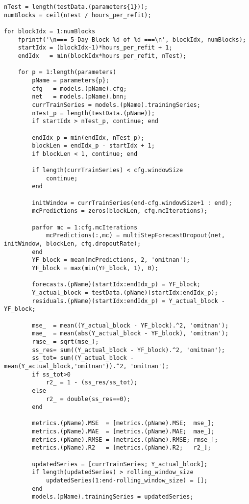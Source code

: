 \begin{verbatim}
nTest = length(testData.(parameters{1}));
numBlocks = ceil(nTest / hours_per_refit);

for blockIdx = 1:numBlocks
    fprintf('\n=== 5-Day Block %d of %d ===\n', blockIdx, numBlocks);
    startIdx = (blockIdx-1)*hours_per_refit + 1;
    endIdx   = min(blockIdx*hours_per_refit, nTest);
    
    for p = 1:length(parameters)
        pName = parameters{p};
        cfg   = models.(pName).cfg;
        net   = models.(pName).bnn;
        currTrainSeries = models.(pName).trainingSeries;
        nTest_p = length(testData.(pName));
        if startIdx > nTest_p, continue; end
        
        endIdx_p = min(endIdx, nTest_p);
        blockLen = endIdx_p - startIdx + 1;
        if blockLen < 1, continue; end
        
        if length(currTrainSeries) < cfg.windowSize
            continue;
        end
        
        initWindow = currTrainSeries(end-cfg.windowSize+1 : end);
        mcPredictions = zeros(blockLen, cfg.mcIterations);
        
        parfor mc = 1:cfg.mcIterations
            mcPredictions(:,mc) = multiStepForecastDropout(net, initWindow, blockLen, cfg.dropoutRate);
        end
        YF_block = mean(mcPredictions, 2, 'omitnan');
        YF_block = max(min(YF_block, 1), 0);
        
        forecasts.(pName)(startIdx:endIdx_p) = YF_block;
        Y_actual_block = testData.(pName)(startIdx:endIdx_p);
        residuals.(pName)(startIdx:endIdx_p) = Y_actual_block - YF_block;
        
        mse_  = mean((Y_actual_block - YF_block).^2, 'omitnan');
        mae_  = mean(abs(Y_actual_block - YF_block), 'omitnan');
        rmse_ = sqrt(mse_);
        ss_res= sum((Y_actual_block - YF_block).^2, 'omitnan');
        ss_tot= sum((Y_actual_block - mean(Y_actual_block,'omitnan')).^2, 'omitnan');
        if ss_tot>0
            r2_ = 1 - (ss_res/ss_tot);
        else
            r2_ = double(ss_res==0);
        end
        
        metrics.(pName).MSE  = [metrics.(pName).MSE;  mse_];
        metrics.(pName).MAE  = [metrics.(pName).MAE;  mae_];
        metrics.(pName).RMSE = [metrics.(pName).RMSE; rmse_];
        metrics.(pName).R2   = [metrics.(pName).R2;   r2_];
        
        updatedSeries = [currTrainSeries; Y_actual_block];
        if length(updatedSeries) > rolling_window_size
            updatedSeries(1:end-rolling_window_size) = [];
        end
        models.(pName).trainingSeries = updatedSeries;
        

\end{verbatim}
